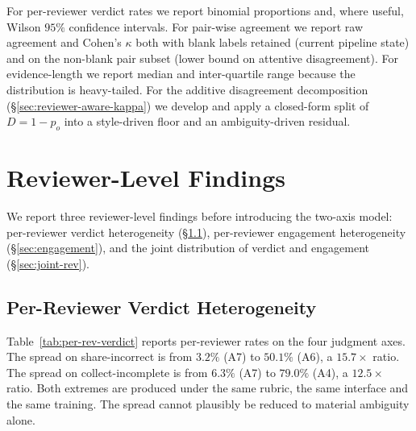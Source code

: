 \documentclass[11pt,a4paper]{article}
\newcommand{\Acc}[1]{\textsf{A#1}}
\begin{document}
For per-reviewer verdict rates we report binomial proportions and,
where useful, Wilson $95\%$ confidence intervals. For pair-wise
agreement we report raw agreement and Cohen's $\kappa$
\citep{cohen1960coefficient,landis1977measurement} both with blank
labels retained (current pipeline state) and on the non-blank pair
subset (lower bound on attentive disagreement). For evidence-length
we report median and inter-quartile range because the distribution
is heavy-tailed. For the additive disagreement decomposition
(\S\ref{sec:reviewer-aware-kappa}) we develop and apply a
closed-form split of $D=1-p_o$ into a style-driven floor and an
ambiguity-driven residual.

\section{Reviewer-Level Findings}
\label{sec:reviewer-findings}

We report three reviewer-level findings before introducing the
two-axis model: per-reviewer verdict heterogeneity
(\S\ref{sec:per-rev-verdict}), per-reviewer engagement
heterogeneity (\S\ref{sec:engagement}), and the joint distribution
of verdict and engagement (\S\ref{sec:joint-rev}).

\subsection{Per-Reviewer Verdict Heterogeneity}
\label{sec:per-rev-verdict}

Table~\ref{tab:per-rev-verdict} reports per-reviewer rates on the
four judgment axes. The spread on share-incorrect is from $3.2\%$
(\Acc{7}) to $50.1\%$ (\Acc{6}), a $15.7{\times}$ ratio. The spread
on collect-incomplete is from $6.3\%$ (\Acc{7}) to $79.0\%$ (\Acc{4}),
a $12.5{\times}$ ratio. Both extremes are produced under the same
rubric, the same interface and the same training. The spread cannot
plausibly be reduced to material ambiguity alone.
\end{document}

